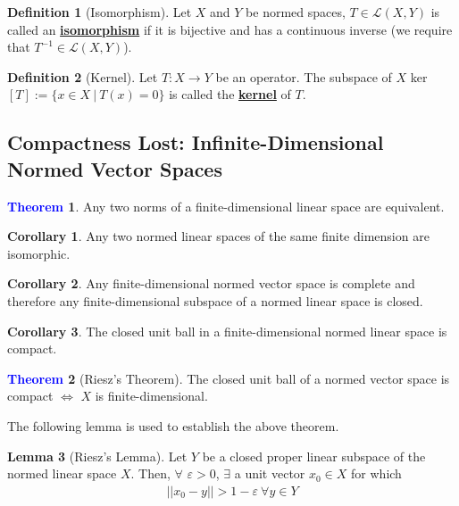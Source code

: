 \documentclass[11pt]{article}
\theoremstyle{definition}
\newcommand{\lop}[2]{\mathcal{L}(#1, #2)}
\theoremstyle{definition}
\newcommand{\dfn}[1]{\underline{\textbf{#1}}}
\newtheorem{theorem}{\textcolor{blue}{Theorem}}
\newtheorem{corollary}{Corollary}
\newtheorem{lemma}[theorem]{Lemma}
\theoremstyle{definition}
\newtheorem{definition}{\textcolor{OliveGreen}{Definition}}
\theoremstyle{remark}
\begin{document}
\begin{definition}[Isomorphism]
	Let $X$ and $Y$ be normed spaces, $T \in \lop{X}{Y}$ is called an \dfn{isomorphism} if it is bijective and has a continuous inverse (we require that $T^{-1} \in \lop{X}{Y}$). 	
\end{definition}

\begin{definition}[Kernel]
	Let $T: X \rightarrow Y$ be an operator. The subspace of $X$ ker$[T] := \{ x \in X\ |\ T(x) = 0 \}$ is called the \dfn{kernel} of $T$. 
\end{definition}


\subsection{Compactness Lost: Infinite-Dimensional Normed Vector Spaces}

\begin{theorem}
	Any two norms of a finite-dimensional linear space are equivalent. 
\end{theorem}

\begin{corollary}
	Any two normed linear spaces of the same finite dimension are isomorphic. 
\end{corollary}

\begin{corollary}
	Any finite-dimensional normed vector space is complete and therefore any finite-dimensional subspace of a normed linear space is closed. 
\end{corollary}

\begin{corollary}
	The closed unit ball in a finite-dimensional normed linear space is compact. 
\end{corollary}

\begin{theorem}[Riesz's Theorem]
	The closed unit ball of a normed vector space is compact $\iff$ $X$ is finite-dimensional.
\end{theorem}

The following lemma is used to establish the above theorem. 

\begin{lemma}[Riesz's Lemma]
	Let $Y$ be a closed proper linear subspace of the normed linear space $X$. Then, $\forall$ $\varepsilon > 0$, $\exists$ a unit vector $x_0 \in X$ for which 
	\begin{align}
		|| x_0 - y || > 1 - \varepsilon\ \forall  y \in Y 	
	\end{align}
\end{lemma}
\end{document}
